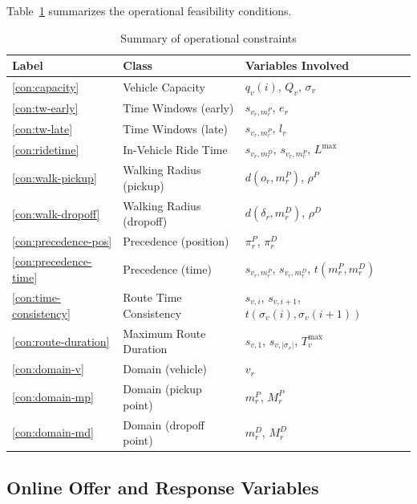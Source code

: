 Table~\ref{tab:constraints} summarizes the operational feasibility conditions.

\begin{table}[width=\textwidth,pos=t]
\centering
\caption{Summary of operational constraints}
\label{tab:constraints}
\begin{tabular}{lll}
\toprule
\textbf{Label} & \textbf{Class} & \textbf{Variables Involved} \\
\midrule
\ref{con:capacity}         & Vehicle Capacity            & $q_v(i)$, $Q_v$, $\sigma_v$ \\
\ref{con:tw-early}         & Time Windows (early)        & $s_{v_r, m_r^P}$, $e_r$ \\
\ref{con:tw-late}          & Time Windows (late)         & $s_{v_r, m_r^P}$, $l_r$ \\
\ref{con:ridetime}         & In-Vehicle Ride Time        & $s_{v_r, m_r^D}$, $s_{v_r, m_r^P}$, $L^{\max}$ \\
\ref{con:walk-pickup}      & Walking Radius (pickup)     & $d(o_r, m_r^P)$, $\rho^P$ \\
\ref{con:walk-dropoff}     & Walking Radius (dropoff)    & $d(\delta_r, m_r^D)$, $\rho^D$ \\
\ref{con:precedence-pos}   & Precedence (position)       & $\pi_r^P$, $\pi_r^D$ \\
\ref{con:precedence-time}  & Precedence (time)           & $s_{v_r, m_r^P}$, $s_{v_r, m_r^D}$, $t(m_r^P, m_r^D)$ \\
\ref{con:time-consistency} & Route Time Consistency      & $s_{v,i}$, $s_{v,i+1}$, $t(\sigma_v(i), \sigma_v(i+1))$ \\
\ref{con:route-duration}   & Maximum Route Duration      & $s_{v,1}$, $s_{v,|\sigma_v|}$, $T_v^{\max}$ \\
\ref{con:domain-v}         & Domain (vehicle)            & $v_r$ \\
\ref{con:domain-mp}        & Domain (pickup point)       & $m_r^P$, $M_r^P$ \\
\ref{con:domain-md}        & Domain (dropoff point)      & $m_r^D$, $M_r^D$ \\
\bottomrule
\end{tabular}
\end{table}

\subsection{Online Offer and Response Variables}

